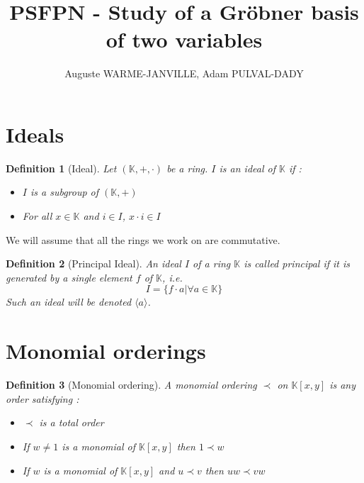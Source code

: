 \documentclass{article}
\newtheorem{definition}{Definition}[section]
\begin{document}
\title{PSFPN - Study of a Gröbner basis of two variables}

\author{Auguste WARME-JANVILLE, Adam PULVAL-DADY}

\maketitle

\section{Ideals}

\begin{definition}[Ideal]
    Let $(\mathbb{K}, +, \cdot)$ be a ring. $I$ is an ideal of $\mathbb{K}$ if : 
    \begin{itemize}
        \item $I$ is a subgroup of $(\mathbb{K}, +)$
        \item For all $x \in \mathbb{K}$ and $i \in I$, $x \cdot i \in I$
    \end{itemize}
\end{definition}

We will assume that all the rings we work on are commutative. 

\begin{definition}[Principal Ideal]
    An ideal $I$ of a ring $\mathbb{K}$ is called principal if it is generated by a single element $f$ of $\mathbb{K}$, \textit{i.e.}
    \begin{displaymath}
        I = \{f \cdot a | \forall a \in \mathbb{K}\}
    \end{displaymath}
    Such an ideal will be denoted $\langle a \rangle$.
\end{definition}

\section{Monomial orderings}

\begin{definition}[Monomial ordering]
    A monomial ordering $\prec$ on $\mathbb{K}[x, y]$ is any order satisfying : 
    \begin{itemize}
        \item $\prec$ is a total order
        \item If $w \neq 1$ is a monomial of $\mathbb{K}[x, y]$ then $1 \prec w$
        \item If $w$ is a monomial of $\mathbb{K}[x, y]$ and $u \prec v$ then $uw \prec vw$
    \end{itemize}
\end{definition}
\end{document}
